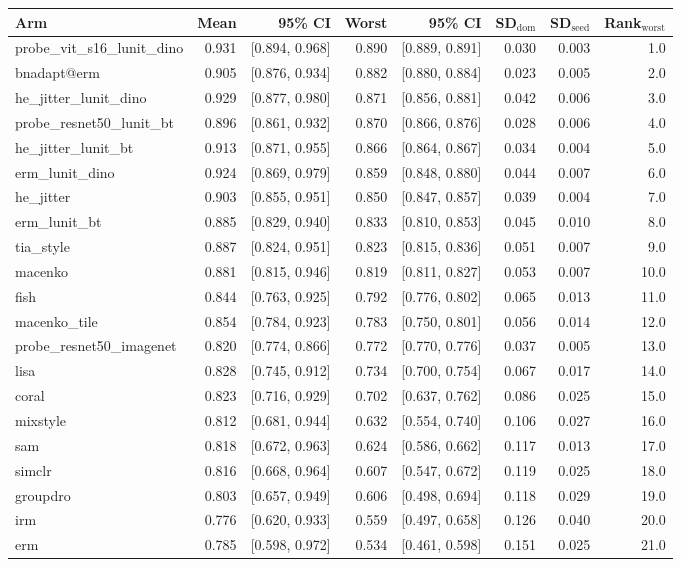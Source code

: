 \begin{tabular}{lrrrrrrr}
\toprule
Arm & Mean & 95\% CI & Worst & 95\% CI & SD$_\text{dom}$ & SD$_\text{seed}$ & Rank$_\text{worst}$ \\
\midrule
probe\_vit\_s16\_lunit\_dino & 0.931 & [0.894, 0.968] & 0.890 & [0.889, 0.891] & 0.030 & 0.003 & 1.0 \\
bnadapt@erm & 0.905 & [0.876, 0.934] & 0.882 & [0.880, 0.884] & 0.023 & 0.005 & 2.0 \\
he\_jitter\_lunit\_dino & 0.929 & [0.877, 0.980] & 0.871 & [0.856, 0.881] & 0.042 & 0.006 & 3.0 \\
probe\_resnet50\_lunit\_bt & 0.896 & [0.861, 0.932] & 0.870 & [0.866, 0.876] & 0.028 & 0.006 & 4.0 \\
he\_jitter\_lunit\_bt & 0.913 & [0.871, 0.955] & 0.866 & [0.864, 0.867] & 0.034 & 0.004 & 5.0 \\
erm\_lunit\_dino & 0.924 & [0.869, 0.979] & 0.859 & [0.848, 0.880] & 0.044 & 0.007 & 6.0 \\
he\_jitter & 0.903 & [0.855, 0.951] & 0.850 & [0.847, 0.857] & 0.039 & 0.004 & 7.0 \\
erm\_lunit\_bt & 0.885 & [0.829, 0.940] & 0.833 & [0.810, 0.853] & 0.045 & 0.010 & 8.0 \\
tia\_style & 0.887 & [0.824, 0.951] & 0.823 & [0.815, 0.836] & 0.051 & 0.007 & 9.0 \\
macenko & 0.881 & [0.815, 0.946] & 0.819 & [0.811, 0.827] & 0.053 & 0.007 & 10.0 \\
fish & 0.844 & [0.763, 0.925] & 0.792 & [0.776, 0.802] & 0.065 & 0.013 & 11.0 \\
macenko\_tile & 0.854 & [0.784, 0.923] & 0.783 & [0.750, 0.801] & 0.056 & 0.014 & 12.0 \\
probe\_resnet50\_imagenet & 0.820 & [0.774, 0.866] & 0.772 & [0.770, 0.776] & 0.037 & 0.005 & 13.0 \\
lisa & 0.828 & [0.745, 0.912] & 0.734 & [0.700, 0.754] & 0.067 & 0.017 & 14.0 \\
coral & 0.823 & [0.716, 0.929] & 0.702 & [0.637, 0.762] & 0.086 & 0.025 & 15.0 \\
mixstyle & 0.812 & [0.681, 0.944] & 0.632 & [0.554, 0.740] & 0.106 & 0.027 & 16.0 \\
sam & 0.818 & [0.672, 0.963] & 0.624 & [0.586, 0.662] & 0.117 & 0.013 & 17.0 \\
simclr & 0.816 & [0.668, 0.964] & 0.607 & [0.547, 0.672] & 0.119 & 0.025 & 18.0 \\
groupdro & 0.803 & [0.657, 0.949] & 0.606 & [0.498, 0.694] & 0.118 & 0.029 & 19.0 \\
irm & 0.776 & [0.620, 0.933] & 0.559 & [0.497, 0.658] & 0.126 & 0.040 & 20.0 \\
erm & 0.785 & [0.598, 0.972] & 0.534 & [0.461, 0.598] & 0.151 & 0.025 & 21.0 \\
\bottomrule
\end{tabular}
